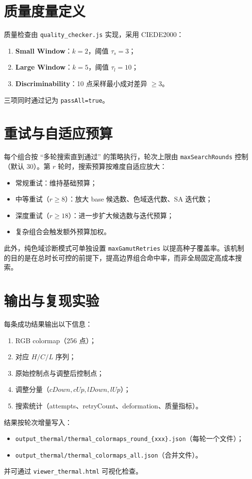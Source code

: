 \documentclass[UTF8,fontset=fandol]{ctexart}
\begin{document}
\section{质量度量定义}
质量检查由 \texttt{quality\_checker.js} 实现，采用 CIEDE2000：
\begin{enumerate}
    \item \textbf{Small Window}：\(k=2\)，阈值 \(\tau_s=3\)；
    \item \textbf{Large Window}：\(k=5\)，阈值 \(\tau_l=10\)；
    \item \textbf{Discriminability}：10 点采样最小成对差异 \(\ge 3\)。
\end{enumerate}
三项同时通过记为 \texttt{passAll=true}。

\section{重试与自适应预算}
每个组合按 ``多轮搜索直到通过'' 的策略执行，轮次上限由 \texttt{maxSearchRounds} 控制（默认 30）。第 \(r\) 轮时，搜索预算按难度自适应放大：
\begin{itemize}
    \item 常规重试：维持基础预算；
    \item 中等重试（\(r \ge 8\)）：放大 base 候选数、色域迭代数、SA 迭代数；
    \item 深度重试（\(r \ge 18\)）：进一步扩大候选数与迭代预算；
    \item 复杂组合会触发额外预算加权。
\end{itemize}
此外，纯色域诊断模式可单独设置 \texttt{maxGamutRetries} 以提高种子覆盖率。该机制的目的是在总时长可控的前提下，提高边界组合命中率，而非全局固定高成本搜索。

\section{输出与复现实验}
每条成功结果输出以下信息：
\begin{enumerate}
    \item RGB colormap（256 点）；
    \item 对应 \(H/C/L\) 序列；
    \item 原始控制点与调整后控制点；
    \item 调整分量（\(cDown,cUp,lDown,lUp\)）；
    \item 搜索统计（attempts、retryCount、deformation、质量指标）。
\end{enumerate}
结果按轮次增量写入：
\begin{itemize}
    \item \texttt{output\_thermal/thermal\_colormaps\_round\_\{xxx\}.json}（每轮一个文件）；
    \item \texttt{output\_thermal/thermal\_colormaps\_all.json}（合并文件）。
\end{itemize}
并可通过 \texttt{viewer\_thermal.html} 可视化检查。
\end{document}
